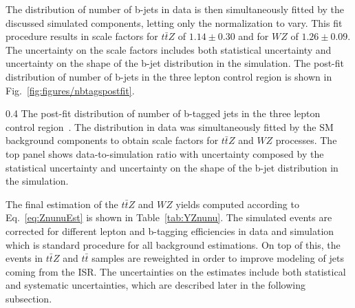 The distribution of number of b-jets in data is then simultaneously fitted by the discussed simulated components, letting only the normalization to vary. This fit procedure results in scale factors for $t\bar{t}Z$ of $1.14 \pm 0.30$ and for $WZ$ of $1.26 \pm 0.09$. The uncertainty on the scale factors includes both statistical uncertainty and uncertainty on the shape of the b-jet distribution in the simulation. The post-fit distribution of number of b-jets in the three lepton control region is shown in Fig.~\ref{fig:figures/nbtagspostfit}.

                 {0.4}       %
                 { The post-fit distribution of number of b-tagged jets in the three lepton control region~\cite{Sirunyan:2017uyt}. The distribution in data was simultaneously fitted by the SM background components to obtain scale factors for $t\bar{t}Z$ and $WZ$ processes. The top panel shows data-to-simulation ratio with uncertainty composed by the statistical uncertainty and uncertainty on the shape of the b-jet distribution in the simulation.  }


The final estimation of the $t\bar{t}Z$ and $WZ$ yields computed according to Eq.~\ref{eq:ZnunuEst} is shown in Table~\ref{tab:YZnunu}. The simulated events are corrected for different lepton and b-tagging efficiencies in data and simulation which is standard procedure for all background estimations. On top of this, the events in $t\bar{t}Z$ and $t\bar{t}$ samples are reweighted in order to improve modeling of jets coming from the ISR. The uncertainties on the estimates include both statistical and systematic uncertainties, which are described later in the following subsection.


